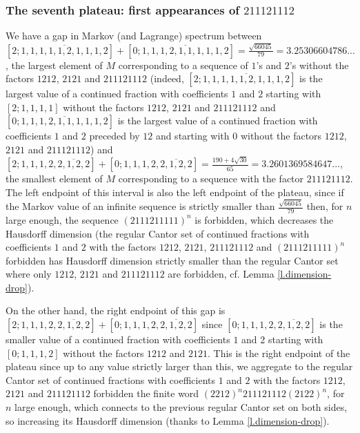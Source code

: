 \documentclass[10pt]{amsart}
\numberwithin{equation}{section}
\theoremstyle{definition}
\begin{document}
\subsubsection{The seventh plateau: first appearances of $211121112$} We have a gap in Markov (and Lagrange) spectrum between $[2;\overline{1,1,1,1,1,2,1,1,1,2}]+[0;\overline{1,1,1,2,1,1,1,1,1,2}]=\frac{\sqrt{66045}}{79}=3.25306604786...$, the largest element of $M$ corresponding to a sequence of $1$'s and $2$'s without the factors $1212$, $2121$ and $211121112$ (indeed, $[2;\overline{1,1,1,1,1,2,1,1,1,2}]$ is the largest value of a continued fraction with coefficients $1$ and $2$ starting with $[2;1,1,1,1]$ without the factors $1212$, $2121$ and $211121112$ and $[0;\overline{1,1,1,2,1,1,1,1,1,2}]$ is the largest value of a continued fraction with coefficients $1$ and $2$ preceded by $12$ and starting with $0$ without the factors $1212$, $2121$ and $211121112$) and $[2;1,1,1,2,\overline{2,1,2,2}]+[0;1,1,1,2,\overline{2,1,2,2}]=\frac{190+4\sqrt{30}}{65}=3.2601369584647...$, the smallest element of $M$ corresponding to a sequence with the factor $211121112$. The left endpoint of this interval is also the left endpoint of the plateau, since if the Markov value of an infinite sequence is strictly smaller than $\frac{\sqrt{66045}}{79}$ then, for $n$ large enough, the sequence $(2111211111)^n$ is forbidden, which decreases the Hausdorff dimension (the regular Cantor set of continued fractions with coefficients $1$ and $2$ with the factors $1212$, $2121$, $211121112$ and $(2111211111)^n$ forbidden has Hausdorff dimension strictly smaller than the regular Cantor set where only $1212$, $2121$ and $211121112$ are forbidden, cf. Lemma \ref{l.dimension-drop}). 

On the other hand, the right endpoint of this gap is $[2;1,1,1,2,\overline{2,1,2,2}]+[0;1,1,1,2,\overline{2,1,2,2}]$ since $[0;1,1,1,2,\overline{2,1,2,2}]$ is the smaller value of a continued fraction with coefficients $1$ and $2$ starting with $[0;1,1,1,2]$ without the factors $1212$ and $2121$. This is the right endpoint of the plateau since up to any value strictly larger than this, we aggregate to the regular Cantor set of continued fractions with coefficients $1$ and $2$ with the factors $1212$, $2121$ and $211121112$ forbidden the finite word $(2212)^n 211121112 (2122)^n$, for $n$ large enough, which connects to the previous regular Cantor set on both sides, so increasing its Hausdorff dimension (thanks to Lemma \ref{l.dimension-drop}).
\end{document}
